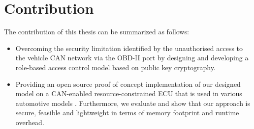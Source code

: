\section{Contribution}
\label{sec:contributions}

The contribution of this thesis can be summarized as follows:

\begin{itemize}
	\item Overcoming the security limitation identified by the unauthorised access to the vehicle CAN network via the OBD-II port by designing and developing a role-based access control model based on public key cryptography.
	
	\item Providing an open source proof of concept implementation of our designed model on a CAN-enabled resource-constrained ECU that is used in various automotive models \cite{Michel}. Furthermore, we evaluate and show that our approach is secure, feasible and lightweight in terms of memory footprint and runtime overhead.
\end{itemize} 

